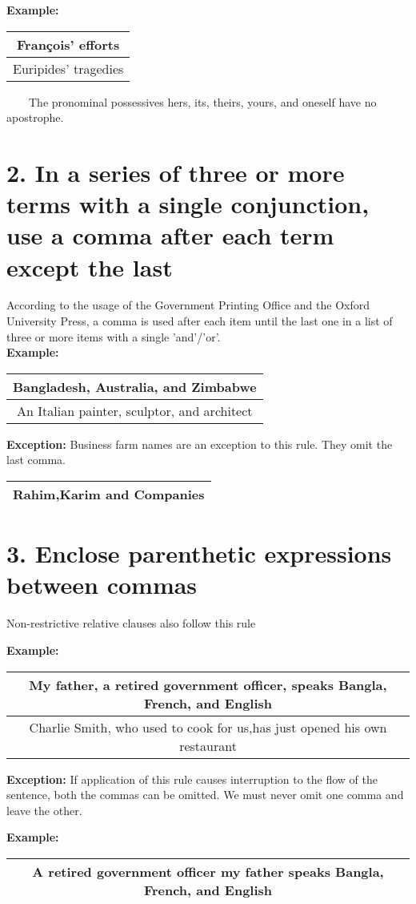 \documentclass{report}
\newcommand{\SingleRowSingleCol}[1]{
    \begin{center}
    \begin{tabular}{|c|}
     \hline
     #1\\\hline
    \end{tabular}
    \end{center}
}
\newcommand{\DoubleRowSingleCol}[2]{
    \begin{center}
    \begin{tabular}{|c|}
     \hline
     #1\\\hline
     #2\\\hline
    \end{tabular}
    \end{center}
}
\begin{document}
\textbf{Example:}
\DoubleRowSingleCol{François’ efforts}{Euripides’ tragedies}
~~~~The pronominal possessives hers, its, theirs, yours, and oneself have no apostrophe.

\newpage

\section*{2. In a series of three or more terms with a single conjunction, use a comma after each term except the last}


According to the usage of the Government Printing Office and the Oxford University
Press, a comma is used after each item until the last one in a list of three or more items
with a single 'and'/'or'.\\

\textbf{Example:}
\DoubleRowSingleCol{Bangladesh, Australia, and Zimbabwe}
{An Italian painter, sculptor, and architect}
\endgraf\bigskip


{\Large\textbf{Exception:}}
Business farm names are an exception to this rule. They omit the last comma.
\endgraf\bigskip

\SingleRowSingleCol{Rahim,Karim and Companies}
\endgraf\bigskip

\section*{3. Enclose parenthetic expressions between commas}

Non-restrictive relative clauses also follow this rule

\endgraf\bigskip

\textbf{Example:}
\DoubleRowSingleCol
{My father, a retired government officer, speaks Bangla, French, and English}
{Charlie Smith, who used to cook for us,has just opened his own restaurant}
\endgraf\bigskip


{\Large\textbf{Exception:}}
If application of this rule causes interruption to the flow of the sentence, both the commas can be omitted. We must never omit one comma and leave the
other. 
\endgraf\bigskip

\textbf{Example:}
\SingleRowSingleCol{A retired government officer my father speaks Bangla, French, and English}
\end{document}
